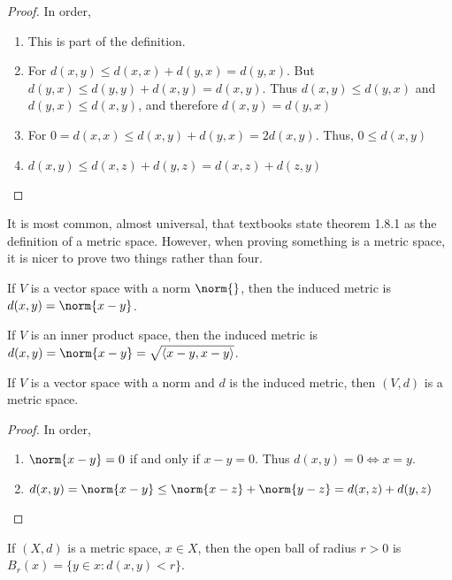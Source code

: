 \documentclass[crop=false,class=book,oneside]{standalone}
\begin{document}
            \begin{proof}
            In order,
            \begin{enumerate}
                \item This is part of the definition.
                \item For $d(x,y) \leq d(x,x)+d(y,x) = d(y,x)$. But $d(y,x) \leq d(y,y)+d(x,y) = d(x,y)$. Thus $d(x,y)\leq d(y,x)$ and $d(y,x) \leq d(x,y)$, and therefore $d(x,y) = d(y,x)$
                \item For $0=d(x,x) \leq d(x,y)+d(y,x) = 2d(x,y)$. Thus, $0\leq d(x,y)$
                \item $d(x,y)\leq d(x,z)+d(y,z) = d(x,z)+d(z,y)$
            \end{enumerate}
            \end{proof}
            \begin{remark}
            It is most common, almost universal, that textbooks state theorem 1.8.1 as the definition of a metric space. However, when proving something is a metric space, it is nicer to prove two things rather than four.
            \end{remark}
            \begin{definition}
            If $V$ is a vector space with a norm $\norm{}$, then the induced metric is $d(x,y) = \norm{x-y}$.
            \end{definition}
            \begin{remark}
            If $V$ is an inner product space, then the induced metric is $d(x,y) = \norm{x-y} = \sqrt{\langle x-y,x-y\rangle }$.
            \end{remark}
            \begin{theorem}
            If $V$ is a vector space with a norm and $d$ is the induced metric, then $(V,d)$ is a metric space.
            \end{theorem}
            \begin{proof}
            In order,
            \begin{enumerate}
            \item $\norm{x-y} = 0$ if and only if $x-y = 0$. Thus $d(x,y) = 0 \Leftrightarrow x=y$.
            \item $d(x,y) = \norm{x-y}\leq \norm{x-z}+\norm{y-z} = d(x,z)+d(y,z)$
            \end{enumerate}
            \end{proof}
            \begin{definition}
            If $(X,d)$ is a metric space, $x\in X$, then the open ball of radius $r>0$ is $B_{r}(x) = \{y\in x: d(x,y)<r\}$.
            \end{definition}
\end{document}
